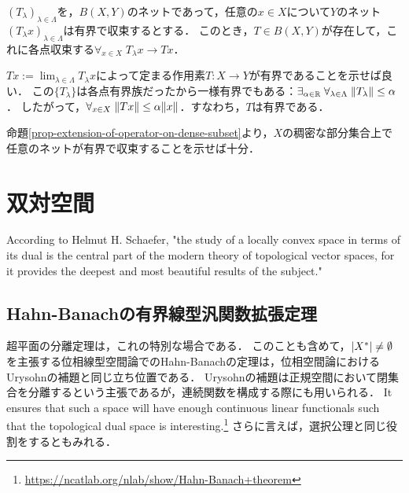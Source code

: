 \documentclass[uplatex,dvipdfmx]{jsreport}
\begin{document}
\begin{corollary}[作用素ネットが各点有界であることの十分条件]
    $(T_\lambda)_{\lambda\in\Lambda}$を，$B(X,Y)$のネットであって，任意の$x\in X$について$Y$のネット$(T_\lambda x)_{\lambda\in\Lambda}$は有界で収束するとする．
    このとき，$T\in B(X,Y)$が存在して，これに各点収束する$\forall_{x\in X}\;T_\lambda x\to Tx$．
\end{corollary}
\begin{Proof}
    $Tx:=\lim_{\lambda\in\Lambda}T_\lambda x$によって定まる作用素$T:X\to Y$が有界であることを示せば良い．
    この$\{T_\lambda\}$は各点有界族だったから一様有界でもある：$\exists_{\alpha\in\mathbb{R}}\;\forall_{\lambda\in\Lambda}\;\|T_\lambda\|\le\alpha$．
    したがって，$\forall_{x\in X}\;\|Tx\|\le\alpha\|x\|$．すなわち，$T$は有界である．
\end{Proof}
\begin{remark}
    命題\ref{prop-extension-of-operator-on-dense-subset}より，$X$の稠密な部分集合上で任意のネットが有界で収束することを示せば十分．

\end{remark}

\section{双対空間}

\begin{tcolorbox}[colframe=ForestGreen, colback=ForestGreen!10!white,breakable,colbacktitle=ForestGreen!40!white,coltitle=black,fonttitle=\bfseries\sffamily,
title=]
According to Helmut H. Schaefer, "the study of a locally convex space in terms of its dual is the central part of the modern theory of topological vector spaces, for it provides the deepest and most beautiful results of the subject."
\end{tcolorbox}

\subsection{Hahn-Banachの有界線型汎関数拡張定理}

\begin{tcolorbox}[colframe=ForestGreen, colback=ForestGreen!10!white,breakable,colbacktitle=ForestGreen!40!white,coltitle=black,fonttitle=\bfseries\sffamily,
title=双対空間の元の存在]
    超平面の分離定理は，これの特別な場合である．
    このことも含めて，$\lvert X^*\rvert\ne\emptyset$を主張する位相線型空間論でのHahn-Banachの定理は，位相空間論におけるUrysohnの補題と同じ立ち位置である．
    Urysohnの補題は正規空間において閉集合を分離するという主張であるが，連続関数を構成する際にも用いられる．
    It ensures that such a space will have enough continuous linear functionals such that the topological dual space is interesting.\footnote{\url{https://ncatlab.org/nlab/show/Hahn-Banach+theorem}}
    さらに言えば，選択公理と同じ役割をするともみれる．
\end{tcolorbox}
\end{document}
